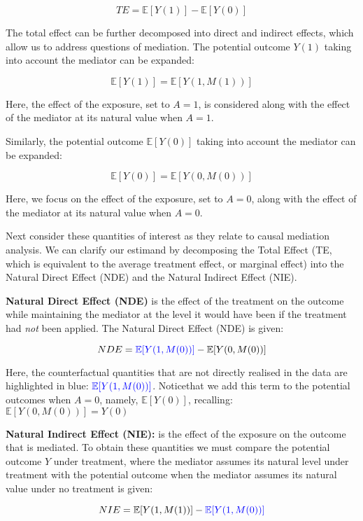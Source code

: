 \documentclass[
  single column]{article}
\begin{document}
\[
TE = \mathbb{E}[Y(1)] - \mathbb{E}[Y(0)]
\]

The total effect can be further decomposed into direct and indirect
effects, which allow us to address questions of mediation. The potential
outcome \(Y(1)\) taking into account the mediator can be expanded:

\[ 
\mathbb{E}[Y(1)] = \mathbb{E}[Y(1, M(1))]
\]

Here, the effect of the exposure, set to \(A = 1\), is considered along
with the effect of the mediator at its natural value when \(A = 1\).

Similarly, the potential outcome \(\mathbb{E}[Y(0)]\) taking into
account the mediator can be expanded:

\[ 
\mathbb{E}[Y(0)] = \mathbb{E}[Y(0, M(0))]
\]

Here, we focus on the effect of the exposure, set to \(A = 0\), along
with the effect of the mediator at its natural value when \(A = 0\).

Next consider these quantities of interest as they relate to causal
mediation analysis. We can clarify our estimand by decomposing the Total
Effect (TE, which is equivalent to the average treatment effect, or
marginal effect) into the Natural Direct Effect (NDE) and the Natural
Indirect Effect (NIE).

\textbf{Natural Direct Effect (NDE)} is the effect of the treatment on
the outcome while maintaining the mediator at the level it would have
been if the treatment had \emph{not} been applied. The Natural Direct
Effect (NDE) is given:

\[
 NDE = \textcolor{blue}{\mathbb{E}[Y(1, M(0))]} - \mathbb{E}[Y(0, M(0))]
 \]

Here, the counterfactual quantities that are not directly realised in
the data are highlighted in blue:
\(\textcolor{blue}{\mathbb{E}[Y(1, M(0))]}\). Noticethat we add this
term to the potential outcomes when \(A=0\), namely,
\(\mathbb{E}[Y(0)]\), recalling: \(\mathbb{E}[Y(0, M(0))] = Y(0)\)

\textbf{Natural Indirect Effect (NIE):} is the effect of the exposure on
the outcome that is mediated. To obtain these quantities we must compare
the potential outcome \(Y\) under treatment, where the mediator assumes
its natural level under treatment with the potential outcome when the
mediator assumes its natural value under no treatment is given:

\[
 NIE = \mathbb{E}[Y(1, M(1))] - \textcolor{blue}{\mathbb{E}[Y(1, M(0))]}
\]
\end{document}
